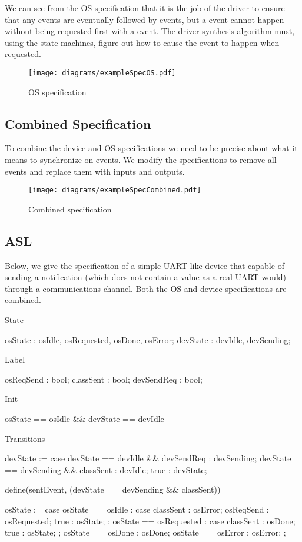 We can see from the OS specification that it is the job of the driver to ensure that any  events are eventually followed by  events, but a  event cannot happen without being requested first with a  event. The driver synthesis algorithm must, using the state machines, figure out how to cause the  event to happen when requested.

\begin{figure}
\centering
\texttt{[image: diagrams/exampleSpecOS.pdf]}
\caption{OS specification}
\label{fig:os_spec}
\end{figure}

\subsection{Combined Specification}

To combine the device and OS specifications we need to be precise about what it means to synchronize on events. We modify the specifications to remove all events and replace them with inputs and outputs.

\begin{figure}
\centering
\texttt{[image: diagrams/exampleSpecCombined.pdf]}
\caption{Combined specification}
\label{fig:combined_spec}
\end{figure}

\subsection{ASL}

Below, we give the specification of a simple UART-like device that capable of sending a notification (which does not contain a value as a real UART would) through a communications channel. Both the OS and device specifications are combined. 

\begin{asllisting}
State

osState  : {osIdle, osRequested, osDone, osError};
devState : {devIdle, devSending};

Label

osReqSend  : bool;
classSent  : bool;
devSendReq : bool;

Init

osState == osIdle && devState == devIdle

Transitions

devState := case {
    devState == devIdle    && devSendReq : devSending;
    devState == devSending && classSent  : devIdle;
    true                                 : devState;
}

define(sentEvent, (devState == devSending && classSent))
 
osState := case {
    osState == osIdle :
        case {
            classSent : osError;
            osReqSend : osRequested;
            true      : osState;
        };
    osState == osRequested :
        case {
            classSent : osDone;
            true      : osState;
        };
    osState == osDone  : osDone;
    osState == osError : osError;
};
\end{asllisting}

